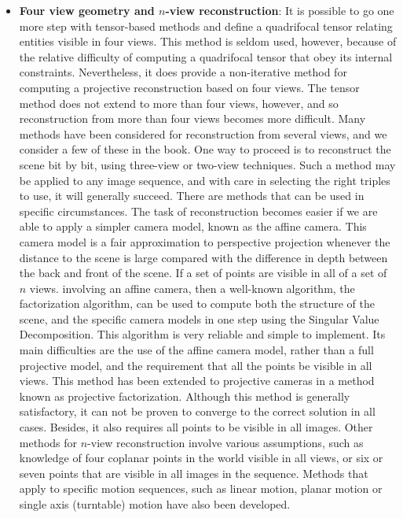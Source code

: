 \documentclass{report}
\begin{document}
\begin{itemize}
        \item \textbf{Four view geometry and $n$-view reconstruction}: It is possible to go one more step with tensor-based methods and define a quadrifocal tensor relating entities visible in four views. This method is seldom used, however, because of the relative difficulty of computing a quadrifocal tensor that obey its internal constraints. Nevertheless, it does provide a non-iterative method for computing a projective reconstruction based on four views. The tensor method does not extend to more than four views, however, and so reconstruction from more than four views becomes more difficult.
            \bigbreak \noindent 
            Many methods have been considered for reconstruction from several views, and we consider a few of these in the book. One way to proceed is to reconstruct the scene bit by bit, using three-view or two-view techniques. Such a method may be applied to any image sequence, and with care in selecting the right triples to use, it will generally succeed. 
            \bigbreak \noindent 
            There are methods that can be used in specific circumstances. The task of reconstruction becomes easier if we are able to apply a simpler camera model, known as the affine camera. This camera model is a fair approximation to perspective projection whenever the distance to the scene is large compared with the difference in depth between the back and front of the scene. If a set of points are visible in all of a set of $n$ views. involving an affine camera, then a well-known algorithm, the factorization algorithm, can be used to compute both the structure of the scene, and the specific camera models in one step using the Singular Value Decomposition. This algorithm is very reliable and simple to implement. Its main difficulties are the use of the affine camera model, rather than a full projective model, and the requirement that all the points be visible in all views.
            \bigbreak \noindent 
            This method has been extended to projective cameras in a method known as projective factorization. Although this method is generally satisfactory, it can not be proven to converge to the correct solution in all cases. Besides, it also requires all points to be visible in all images.
            \bigbreak \noindent 
            Other methods for $n$-view reconstruction involve various assumptions, such as knowledge of four coplanar points in the world visible in all views, or six or seven points that are visible in all images in the sequence. Methods that apply to specific motion sequences, such as linear motion, planar motion or single axis (turntable) motion have also been developed.

\end{itemize}
\end{document}
